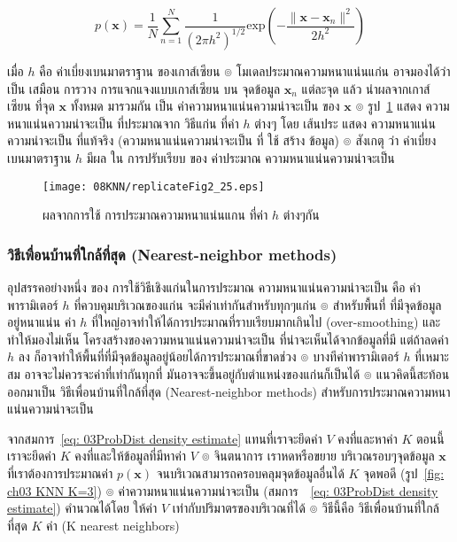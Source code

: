 \begin{equation}
  p(\mathbf{x}) = \frac{1}{N} \sum_{n=1}^N \frac{1}{(2 \pi h^2)^{1/2}} \mathrm{exp} \left( - \frac{\| \mathbf{x} - \mathbf{x}_n \|^2}{2 h^2} \right)
\label{eq: 03ProbDist gaussian kernel density} 
\end{equation}

เมื่อ $h$ คือ ค่าเบี่ยงเบนมาตราฐาน ของเกาส์เซียน
๏
โมเดลประมาณความหนาแน่นแก่น อาจมองได้ว่า เป็น เสมือน การวาง การแจกแจงแบบเกาส์เซียน บน จุดข้อมูล $\mathbf{x}_n$ แต่ละจุด แล้ว นำผลจากเกาส์เซียน ที่จุด $\mathbf{x}$ ทั้งหมด มารวมกัน เป็น ค่าความหนาแน่นความน่าจะเป็น ของ $\mathbf{x}$
๏ รูป~\ref{fig: CH03 kernel density estimator h impact} แสดง ความหนาแน่นความน่าจะเป็น ที่ประมาณจาก วิธีแก่น ที่ค่า $h$ ต่างๆ โดย เส้นประ แสดง ความหนาแน่นความน่าจะเป็น ที่แท้จริง (ความหนาแน่นความน่าจะเป็น ที่ ใช้ สร้าง ข้อมูล)
๏ สังเกตุ ว่า ค่าเบี่ยงเบนมาตราฐาน $h$ มีผล ใน การปรับเรียบ ของ ค่าประมาณ ความหนาแน่นความน่าจะเป็น

%
\begin{figure}
\begin{center}
\texttt{[image: 08KNN/replicateFig2\_25.eps]}
\end{center}
\caption{ผลจากการใช้ การประมาณความหนาแน่นแกน ที่ค่า $h$ ต่างๆกัน}
\label{fig: CH03 kernel density estimator h impact}
\end{figure}

\subsubsection{วิธีเพื่อนบ้านที่ใกล้ที่สุด (Nearest-neighbor methods)}

อุปสรรคอย่างหนึ่ง ของ การใช้วิธีเชิงแก่นในการประมาณ ความหนาแน่นความน่าจะเป็น คือ ค่าพารามิเตอร์ $h$ ที่ควบคุมบริเวณของแก่น จะมีค่าเท่ากันสำหรับทุกๆแก่น
๏ สำหรับพื้นที่ ที่มีจุดข้อมูลอยู่หนาแน่น ค่า $h$ ที่ใหญ่อาจทำให้ได้การประมาณที่ราบเรียบมากเกินไป (over-smoothing) และทำให้มองไม่เห็น โครงสร้างของความหนาแน่นความน่าจะเป็น ที่น่าจะเห็นได้จากข้อมูลที่มี แต่ถ้าลดค่า $h$ ลง ก็อาจทำให้พื้นที่ที่มีจุดข้อมูลอยู่น้อยได้การประมาณที่ขาดช่วง
๏ บางทีค่าพารามิเตอร์ $h$ ที่เหมาะสม อาจจะไม่ควรจะค่าที่เท่ากันทุกที่ มันอาจจะขึ้นอยู่กับตำแหน่งของแก่นก็เป็นได้
๏ แนวคิดนี้สะท้อนออกมาเป็น วิธีเพื่อนบ้านที่ใกล้ที่สุด (Nearest-neighbor methods) สำหรับการประมาณความหนาแน่นความน่าจะเป็น

จากสมการ~\ref{eq: 03ProbDist density estimate} แทนที่เราจะยึดค่า $V$ คงที่และหาค่า $K$ ตอนนี้เราจะยึดค่า $K$ คงที่และให้ข้อมูลที่มีหาค่า $V$
๏ จินตนาการ เราหดหรือขยาย บริเวณรอบๆจุดข้อมูล $\mathbf{x}$ ที่เราต้องการประมาณค่า $p(\mathbf{x})$
จนบริเวณสามารถครอบคลุมจุดข้อมูลอื่นได้ $K$ จุดพอดี (รูป~\ref{fig: ch03 KNN K=3})
๏ ค่าความหนาแน่นความน่าจะเป็น (สมการ~~\ref{eq: 03ProbDist density estimate}) คำนวณได้โดย ให้ค่า $V$ เท่ากับปริมาตรของบริเวณที่ได้
๏ วิธีนี้คือ วิธีเพื่อนบ้านที่ใกล้ที่สุด $K$ ค่า (K nearest neighbors)

